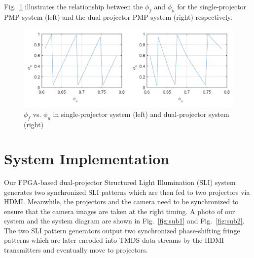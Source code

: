 \documentclass[]{spie}  %
\begin{document}
Fig.~\ref{Fig:3} illustrates the relationship between the $\phi_f$ and $\phi_h$ for the single-projector PMP system (left) and the dual-projector PMP system (right) respectively.
\begin{figure}[!t]
  \includegraphics[width=\linewidth]{phase.png}
  \caption{$\phi_f$ vs. $\phi_u$ in single-projector system (left) and dual-projector system (right)}
  \label{Fig:3}
\end{figure}




















\section{System Implementation}
Our FPGA-based dual-projector Structured Light Illumination (SLI) system generates two synchronized SLI patterns which are then fed to two projectors via HDMI. Meanwhile, the projectors and the camera need to be synchronized to ensure that the camera images are taken at the right timing. A photo of our system and the system diagram are shown in Fig.~\ref{fig:sub1} and Fig.~\ref{fig:sub2}. The two SLI pattern generators output two synchronized phase-shifting fringe patterns which are later encoded into TMDS data streams by the HDMI transmitters and eventually move to projectors. 
\end{document}
